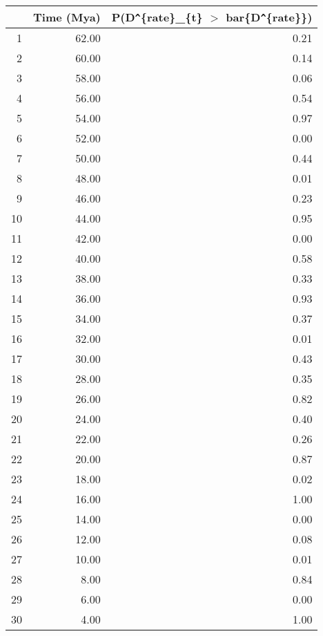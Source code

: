 \begin{table}[ht]
\centering
\begin{tabular}{rrr}
  \hline
 & Time (Mya) & P(D\verb|^|\{rate\}\_\{t\} $>$ bar\{D\verb|^|\{rate\}\}) \\ 
  \hline
1 & 62.00 & 0.21 \\ 
  2 & 60.00 & 0.14 \\ 
  3 & 58.00 & 0.06 \\ 
  4 & 56.00 & 0.54 \\ 
  5 & 54.00 & 0.97 \\ 
  6 & 52.00 & 0.00 \\ 
  7 & 50.00 & 0.44 \\ 
  8 & 48.00 & 0.01 \\ 
  9 & 46.00 & 0.23 \\ 
  10 & 44.00 & 0.95 \\ 
  11 & 42.00 & 0.00 \\ 
  12 & 40.00 & 0.58 \\ 
  13 & 38.00 & 0.33 \\ 
  14 & 36.00 & 0.93 \\ 
  15 & 34.00 & 0.37 \\ 
  16 & 32.00 & 0.01 \\ 
  17 & 30.00 & 0.43 \\ 
  18 & 28.00 & 0.35 \\ 
  19 & 26.00 & 0.82 \\ 
  20 & 24.00 & 0.40 \\ 
  21 & 22.00 & 0.26 \\ 
  22 & 20.00 & 0.87 \\ 
  23 & 18.00 & 0.02 \\ 
  24 & 16.00 & 1.00 \\ 
  25 & 14.00 & 0.00 \\ 
  26 & 12.00 & 0.08 \\ 
  27 & 10.00 & 0.01 \\ 
  28 & 8.00 & 0.84 \\ 
  29 & 6.00 & 0.00 \\ 
  30 & 4.00 & 1.00 \\ 
   \hline
\end{tabular}
\label{tab:rate_peak}
\end{table}
